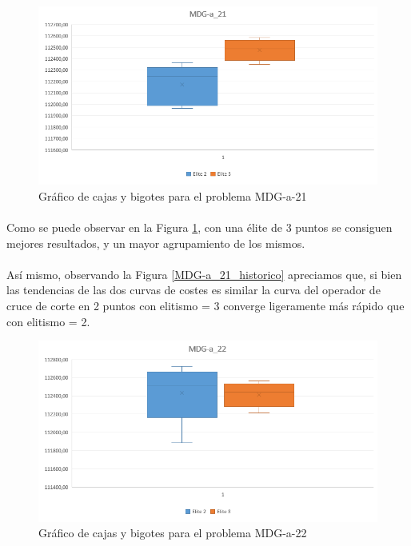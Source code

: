 	\begin{figure}[H]
		\centering
		\includegraphics[scale=0.65]{img/2point_2vs3/MDG1}
		\caption{Gráfico de cajas y bigotes para el problema MDG-a-21}
		\label{MDGa1_2Puntos}
		
	\end{figure}

	\paragraph{}Como se puede observar en la Figura \ref{MDGa1_2Puntos}, con una élite de 3 puntos se consiguen mejores resultados, y un mayor agrupamiento de los mismos.
	
	\paragraph{}Así mismo, observando la Figura \ref{MDG-a_21_historico} apreciamos que, si bien las tendencias de las dos curvas de costes es similar la curva del operador de cruce de corte en 2 puntos con elitismo = 3 converge ligeramente más rápido que con elitismo = 2.

	\begin{figure}[H]
		\centering
		\includegraphics[scale=0.65]{img/2point_2vs3/MDG2}
		\caption{Gráfico de cajas y bigotes para el problema MDG-a-22}
		\label{MDGa2_2Puntos}
	
	\end{figure}


